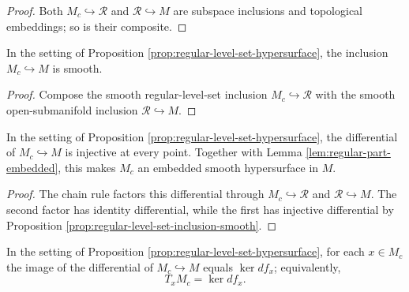 \begin{proof}

\sketch Both $M_c\hookrightarrow\mathcal R$ and $\mathcal R\hookrightarrow M$ are
subspace inclusions and topological embeddings; so is their composite.
\end{proof}

\begin{lemma}
\label{lem:regular-part-inclusion-smooth}





In the setting of Proposition \ref{prop:regular-level-set-hypersurface}, the inclusion
$M_c\hookrightarrow M$ is smooth.
\end{lemma}

\begin{proof}

\sketch Compose the smooth regular-level-set inclusion $M_c\hookrightarrow\mathcal R$
with the smooth open-submanifold inclusion $\mathcal R\hookrightarrow M$.
\end{proof}

\begin{lemma}
\label{lem:regular-part-inclusion-immersion}





In the setting of Proposition \ref{prop:regular-level-set-hypersurface}, the
differential of $M_c\hookrightarrow M$ is injective at every point. Together with
Lemma \ref{lem:regular-part-embedded}, this makes $M_c$ an embedded smooth
hypersurface in $M$.
\end{lemma}

\begin{proof}

\sketch The chain rule factors this differential through $M_c\hookrightarrow\mathcal R$
and $\mathcal R\hookrightarrow M$. The second factor has identity differential,
while the first has injective differential by Proposition
\ref{prop:regular-level-set-inclusion-smooth}.
\end{proof}

\begin{lemma}
\label{lem:regular-part-tangent-kernel}





In the setting of Proposition \ref{prop:regular-level-set-hypersurface}, for each
$x\in M_c$ the image of the differential of $M_c\hookrightarrow M$ equals
$\ker df_x$; equivalently,
\[
T_xM_c=\ker df_x.
\]
\end{lemma}

